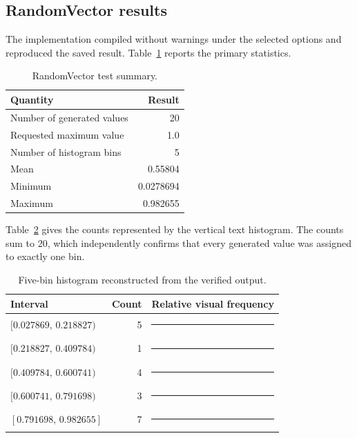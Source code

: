 \documentclass[11pt,a4paper]{article}
\begin{document}
\subsection{RandomVector results}

The implementation compiled without warnings under the selected options and reproduced the saved result. Table~\ref{tab:random-summary} reports the primary statistics.

\begin{table}[H]
  \centering
  \caption{RandomVector test summary.}
  \label{tab:random-summary}
  \begin{tabular}{lr}
    \toprule
    Quantity & Result \\
    \midrule
    Number of generated values & 20 \\
    Requested maximum value & 1.0 \\
    Number of histogram bins & 5 \\
    Mean & 0.55804 \\
    Minimum & 0.0278694 \\
    Maximum & 0.982655 \\
    \bottomrule
  \end{tabular}
\end{table}

Table~\ref{tab:histogram} gives the counts represented by the vertical text histogram. The counts sum to 20, which independently confirms that every generated value was assigned to exactly one bin.

\begin{table}[H]
  \centering
  \caption{Five-bin histogram reconstructed from the verified output.}
  \label{tab:histogram}
  \begin{tabular}{p{}rp{}}
    \toprule
    Interval & Count & Relative visual frequency \\
    \midrule
    $[0.027869,\,0.218827)$ & 5 & \textcolor{oucblue}{\rule{25mm}{2.2mm}} \\
    $[0.218827,\,0.409784)$ & 1 & \textcolor{oucblue}{\rule{5mm}{2.2mm}} \\
    $[0.409784,\,0.600741)$ & 4 & \textcolor{oucblue}{\rule{20mm}{2.2mm}} \\
    $[0.600741,\,0.791698)$ & 3 & \textcolor{oucblue}{\rule{15mm}{2.2mm}} \\
    $[0.791698,\,0.982655]$ & 7 & \textcolor{oucblue}{\rule{35mm}{2.2mm}} \\
    \bottomrule
  \end{tabular}
\end{table}
\end{document}
